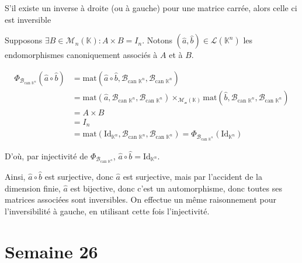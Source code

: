 \documentclass{article}
\renewenvironment{question_kholle}[2][ ]
{
	\subsection{\texorpdfstring{#2}{}}
	\notblank{#1}
	{
		\noindent #1
		\bigbreak
	}
	{}
	\begin{proof}
}
{
	\end{proof}
}
\begin{document}
\begin{question_kholle}
	[Soit $A \in \mathcal{M}_{n}(\mathbb{K})$
	\begin{itemize}
		\item S'il existe $B \in \mathcal{M}_{n}(\mathbb{K}):A\times B = I_{n}$, alors $A\in GL_{n}(\mathbb{K})$ et $A^{-1}=B$
		\item S'il existe $B \in \mathcal{M}_{n}(\mathbb{K}):B \times A = I_{n}$, alors $A\in GL_{n}(\mathbb{K})$ et $A^{-1}=B$
	\end{itemize}
	]
	{S'il existe un inverse à droite (ou à gauche) pour une matrice carrée, alors celle ci est inversible}


	Supposons $\exists B \in \mathcal{M}_{n}(\mathbb{K}):A\times B = I_{n}$. Notons $(\hat{a}, \hat{b}) \in \mathcal{L}(\mathbb{K}^{n})$ les endomorphismes canoniquement associés à $A$ et à $B$.


	\begin{align*}
		\Phi_{\mathcal{B}_{\text{can } \mathbb{K}^{n}}}(\hat{a} \circ \hat{b}) &= \mathrm{mat}(\hat{a} \circ  \hat{b}, \mathcal{B}_{\text{can } \mathbb{K}^{n}}, \mathcal{B}_{\text{can } \mathbb{K}^{n}}) \\
		&= \mathrm{mat}(\hat{a}, \mathcal{B}_{\text{can } \mathbb{K}^{n}}, \mathcal{B}_{\text{can } \mathbb{K}^{n}}) \times_{\mathcal{M_{n}(\mathbb{K})}} \mathrm{mat}(\hat{b}, \mathcal{B}_{\text{can } \mathbb{K}^{n}}, \mathcal{B}_{\text{can } \mathbb{K}^{n}}) \\
		&= A \times B \\
		&= I_{n} \\
		&= \mathrm{mat}(\mathrm{Id}_{\mathbb{K}^{n}}, \mathcal{B}_{\text{can } \mathbb{K}^{n}}, \mathcal{B}_{\text{can } \mathbb{K}^{n}}) = \Phi_{\mathcal{B}_{\text{can } \mathbb{K}^{n}}}(\mathrm{Id}_{\mathbb{K}^{n}})
	\end{align*}


	D'où, par injectivité de $\Phi_{\mathcal{B}_{\text{can } \mathbb{K}^{n}}}$, $\hat{a} \circ \hat{b} = \mathrm{Id}_{\mathbb{K}^{n}}$.

	Ainsi, $\hat{a} \circ \hat{b}$ est surjective, donc $\hat{a}$ est surjective, mais par l'accident de la dimension finie, $\hat{a}$ est bijective, donc c'est un automorphisme, donc toutes ses matrices associées sont inversibles. On effectue un même raisonnement pour l'inversibilité à gauche, en utilisant cette fois l'injectivité.
\end{question_kholle}
\pagebreak\section{Semaine 26}
	
\end{document}
